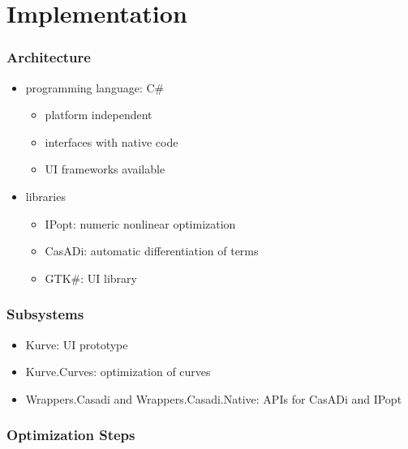 \documentclass[mathserif]{beamer}
\begin{document}
	\section{Implementation}

		\begin{frame}
			\frametitle{Architecture}
			\begin{itemize}
				\item programming language: C\#
				\begin{itemize}
					\item platform independent
					\item interfaces with native code
					\item UI frameworks available
				\end{itemize}
				\item libraries
				\begin{itemize}
					\item IPopt: numeric nonlinear optimization
					\item CasADi: automatic differentiation of terms
					\item GTK\#: UI library
				\end{itemize}
			\end{itemize}
		\end{frame}

		\begin{frame}
			\frametitle{Subsystems}
			\begin{itemize}
				\item Kurve: UI prototype
				\item Kurve.Curves: optimization of curves
				\item Wrappers.Casadi and Wrappers.Casadi.Native: APIs for CasADi and IPopt
			\end{itemize}
		\end{frame}

		\begin{frame}
			\frametitle{Optimization Steps}
			\\
		\end{frame}
\end{document}
